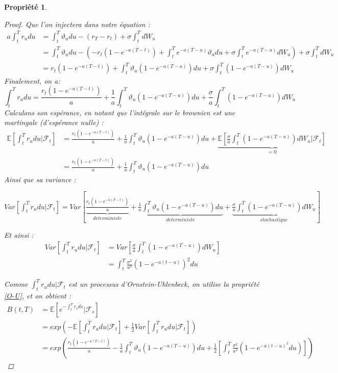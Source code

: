 \documentclass[11pt]{article}
\newtheorem{property}[theorem]{Propriété}
\let\vega\vartheta
\begin{document}
\begin{property}
\begin{proof}
        Que l'on injectera dans notre équation : 
        \begin{align*}
        	a \int_t^T r_u du & = \int_t^T \vega_u du - ( r_T - r_t ) + \sigma\int_t^T dW_u \\
              				 & = \int_t^T \vega_u du - ( - r_{t}(1-e^{-a(T-t)})+\int_t^T e^{-a(T-u)}\vega_u du + \sigma \int_t^T e^{-a(T-u)}dW_u )+ \sigma\int_t^T dW_u \\
							 & =  r_{t}(1-e^{-a(T-t)}) + \int_t^T \vega_u (1-e^{-a(T-u)}) du + \sigma \int_t^T (1-e^{-a(T-u)}) dW_u 
		\end{align*}
        Finalement, on a:
        \begin{displaymath}
        	\int_t^T r_u du = \frac{ r_t (1-e^{-a(T-t)})}{a} + \frac{1}{a}\int_t^T \vega_u (1-e^{-a(T-u)}) du + \frac{\sigma}{a} \int_t^T (1-e^{-a(T-u)}) dW_u 
        \end{displaymath}
        Calculons son espérance, en notant que l'intégrale sur le brownien est une martingale (d'espérance nulle) :
        \begin{align*}
        	\mathbb{E}[\int_t^T r_u du | \mathcal{F}_t] & = \frac{ r_t (1-e^{-a(T-t)})}{a} + \frac{1}{a}\int_t^T \vega_u (1-e^{-a(T-u)}) du + \underbrace{\mathbb{E}[\frac{\sigma}{a} \int_t^T (1-e^{-a(T-u)}) dW_u|\mathcal{F}_t]}_{=0}\\
            & = \frac{ r_t (1-e^{-a(T-t)})}{a} + \frac{1}{a}\int_t^T \vega_u (1-e^{-a(T-u)}) du
        \end{align*}
    	Ainsi que sa variance :
        \begin{center}
        $Var[\int_t^T r_u du | \mathcal{F}_t] = Var[ \underbrace{\frac{ r_t (1-e^{-a(T-t)})}{a}}_{deterministe} + \underbrace{\frac{1}{a}\int_t^T \vega_u (1-e^{-a(T-u)}) du}_{deterministe} + \underbrace{\frac{\sigma}{a} \int_t^T (1-e^{-a(T-u)}) dW_u}_{stochastique}]$
        \end{center}
        Et ainsi : 
        \begin{align*}
        Var[\int_t^T r_u du | \mathcal{F}_t] & = Var[\frac{\sigma}{a} \int_t^T (1-e^{-a(T-u)}) dW_u] \\
           									 & = \int_t^T \frac{{\sigma}^2}{a^2}(1-e^{-a(t-u)})^2 du
        \end{align*}
        
        
        Comme $\int_t^T r_u du | \mathcal{F}_t$ est un processus d'Ornstein-Uhlenbeck, on utilise la propriété \ref{O-U}, et on obtient :
        \begin{align*}
        	B(t,T)  & = \mathbb{E}[e^{-\int_t^T r_s ds}|\mathcal{F}_s] \\
            	& = exp(-\mathbb{E}[\int_t^T r_u du | \mathcal{F}_t] + \frac{1}{2}Var[\int_t^T r_u du | \mathcal{F}_t]) \\
                & = exp(\frac{ r_t (1-e^{-a(T-t)})}{a} - \frac{1}{a}\int_t^T \vega_u (1-e^{-a(T-u)}) du + \frac{1}{2}[\int_t^T \frac{{\sigma}^2}{a^2}(1-e^{-a(t-u)^2} du)])
        \end{align*}
    \end{proof}
    
    
\end{property}
\end{document}

